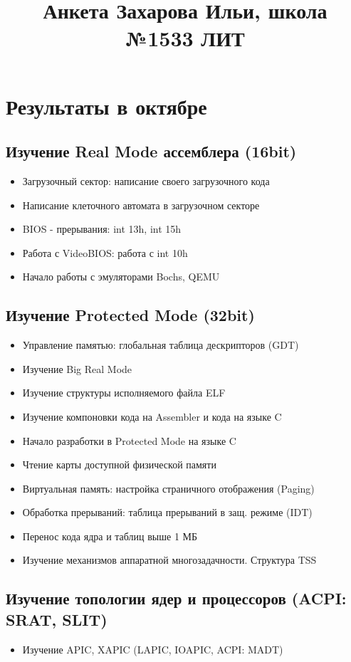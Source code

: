 \documentclass[a4paper,11pt]{extarticle}
\title{\vspace{-2.5cm}Анкета Захарова Ильи, школа №1533 ЛИТ\vspace{-1cm}}
\date{}
\begin{document}
\maketitle
\section{Результаты в октябре}

	\subsection{Изучение Real Mode ассемблера (16bit)}
\begin{itemize}
	\item Загрузочный сектор: написание своего загрузочного кода
	\item Написание клеточного автомата в загрузочном секторе
	\item BIOS - прерывания: int 13h, int 15h
	\item Работа с VideoBIOS: работа с int 10h
	\item Начало работы с эмуляторами Bochs, QEMU
\end{itemize}
\subsection{Изучение Protected Mode (32bit)}
\begin{itemize}
	\item Управление памятью: глобальная таблица дескрипторов (GDT)
	\item Изучение Big Real Mode
	\item Изучение структуры исполняемого файла ELF
	\item Изучение компоновки кода на Assembler и кода на языке C
	\item Начало разработки в Protected Mode на языке C
	\item Чтение карты доступной физической памяти
	\item Виртуальная память: настройка страничного отображения (Paging)
	\item Обработка прерываний: таблица прерываний в защ. режиме (IDT)
	\item Перенос кода ядра и таблиц выше 1 МБ
	\item Изучение механизмов аппаратной многозадачности. Структура TSS
\end{itemize}
\subsection{Изучение топологии ядер и процессоров (ACPI: SRAT, SLIT)}
\begin{itemize}
	\item Изучение APIC, XAPIC (LAPIC, IOAPIC, ACPI: MADT)
\end{itemize}
\end{document}

